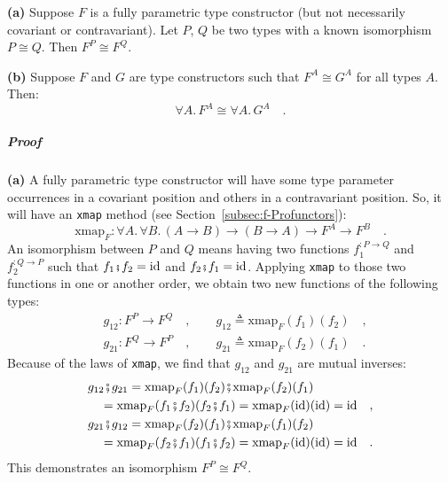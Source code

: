 \textbf{(a)} Suppose $F$ is a fully parametric type constructor (but
not necessarily covariant or contravariant). Let $P$, $Q$ be two
types with a known isomorphism $P\cong Q$. Then $F^{P}\cong F^{Q}$.

\textbf{(b)} Suppose $F$ and $G$ are type constructors such that
$F^{A}\cong G^{A}$ for all types $A$. Then:
\[
\forall A.\,F^{A}\cong\forall A.\,G^{A}\quad.
\]


\subparagraph{Proof}

\textbf{(a)} A fully parametric type constructor will have some type
parameter occurrences in a covariant position and others in a contravariant
position. So, it will have an \lstinline!xmap! method (see Section~\ref{subsec:f-Profunctors}):
\[
\text{xmap}_{F}:\forall A.\,\forall B.\,(A\rightarrow B)\rightarrow(B\rightarrow A)\rightarrow F^{A}\rightarrow F^{B}\quad.
\]
An isomorphism between $P$ and $Q$ means having two functions $f_{1}^{:P\rightarrow Q}$
and $f_{2}^{:Q\rightarrow P}$ such that $f_{1}\bef f_{2}=\text{id}$
and $f_{2}\bef f_{1}=\text{id}$. Applying \lstinline!xmap! to those
two functions in one or another order, we obtain two new functions
of the following types:
\begin{align*}
 & g_{12}:F^{P}\rightarrow F^{Q}\quad,\quad\quad g_{12}\triangleq\text{xmap}_{F}(f_{1})(f_{2})\quad,\\
 & g_{21}:F^{Q}\rightarrow F^{P}\quad,\quad\quad g_{21}\triangleq\text{xmap}_{F}(f_{2})(f_{1})\quad.
\end{align*}
Because of the laws of \lstinline!xmap!, we find that $g_{12}$ and
$g_{21}$ are mutual inverses:
\begin{align*}
 & g_{12}\bef g_{21}=\text{xmap}_{F}(f_{1})(f_{2})\bef\text{xmap}_{F}(f_{2})(f_{1})\\
 & \quad=\text{xmap}_{F}(f_{1}\bef f_{2})(f_{2}\bef f_{1})=\text{xmap}_{F}(\text{id})(\text{id})=\text{id}\quad,\\
 & g_{21}\bef g_{12}=\text{xmap}_{F}(f_{2})(f_{1})\bef\text{xmap}_{F}(f_{1})(f_{2})\\
 & \quad=\text{xmap}_{F}(f_{2}\bef f_{1})(f_{1}\bef f_{2})=\text{xmap}_{F}(\text{id})(\text{id})=\text{id}\quad.
\end{align*}
This demonstrates an isomorphism $F^{P}\cong F^{Q}$.

